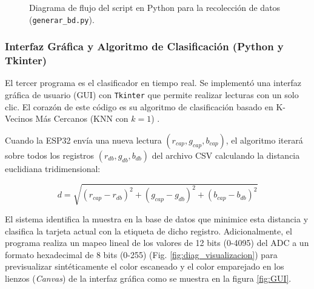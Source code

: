 \documentclass[conference]{IEEEtran}
\begin{document}
\begin{figure}[htbp]
{
    }
    \caption{Diagrama de flujo del script en Python para la recolección de datos (\texttt{generar\_bd.py}).}
    \label{fig:diag_generar_bd}
\end{figure}

\subsubsection{Interfaz Gráfica y Algoritmo de Clasificación (Python y Tkinter)}
El tercer programa es el clasificador en tiempo real. Se implementó una interfaz gráfica de usuario (GUI) con \texttt{Tkinter} que permite realizar lecturas con un solo clic. El corazón de este código es su algoritmo de clasificación basado en K-Vecinos Más Cercanos (KNN con $k=1$) \cite{ldr_6}. 

Cuando la ESP32 envía una nueva lectura $(r_{cap}, g_{cap}, b_{cap})$, el algoritmo iterará sobre todos los registros $(r_{db}, g_{db}, b_{db})$ del archivo CSV calculando la distancia euclidiana tridimensional:

\begin{equation}
d = \sqrt{(r_{cap} - r_{db})^2 + (g_{cap} - g_{db})^2 + (b_{cap} - b_{db})^2}
\label{eq:dist}
\end{equation}

El sistema identifica la muestra en la base de datos que minimice esta distancia y clasifica la tarjeta actual con la etiqueta de dicho registro. Adicionalmente, el programa realiza un mapeo lineal de los valores de 12 bits (0-4095) del ADC a un formato hexadecimal de 8 bits (0-255) (Fig. \ref{fig:diag_visualizacion}) para previsualizar sintéticamente el color escaneado y el color emparejado en los lienzos (\textit{Canvas}) de la interfaz gráfica como se muestra en la figura \ref{fig:GUI}.
\end{document}
